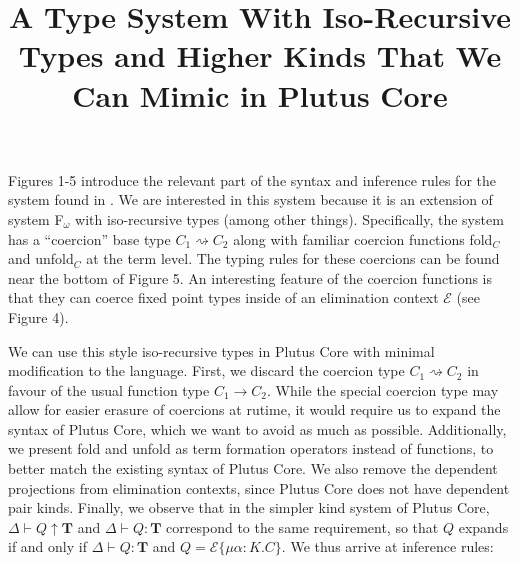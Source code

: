 \documentclass{article}
\title{A Type System With Iso-Recursive Types and Higher Kinds That We Can Mimic in Plutus Core}
\renewcommand{\:}{\mathbin{:}}
\begin{document}
\maketitle

Figures 1-5 introduce the relevant part of the syntax and inference rules for the system found in \cite{Dreyer05}. We are interested in this system because it is an extension of system F$_\omega$ with iso-recursive types (among other things). Specifically, the system has a ``coercion'' base type $C_1 \rightsquigarrow C_2$ along with familiar coercion functions {\sf fold}$_C$ and {\sf unfold}$_C$ at the term level. The typing rules for these coercions can be found near the bottom of Figure 5. An interesting feature of the coercion functions is that they can coerce fixed point types inside of an elimination context $\mathcal{E}$ (see Figure 4).

We can use this style iso-recursive types in Plutus Core with minimal modification to the language. First, we discard the coercion type $C_1 \rightsquigarrow C_2$ in favour of the usual function type $C_1 \longrightarrow C_2$. While the special coercion type may allow for easier erasure of coercions at rutime, it would require us to expand the syntax of Plutus Core, which we want to avoid as much as possible. Additionally, we present {\sf fold} and {\sf unfold} as term formation operators instead of functions, to better match the existing syntax of Plutus Core. We also remove the dependent projections from elimination contexts, since Plutus Core does not have dependent pair kinds. Finally, we observe that in the simpler kind system of Plutus Core, $\Delta \vdash Q \uparrow \textbf{T}$ and $\Delta \vdash Q \: \textbf{T}$ correspond to the same requirement, so that $Q$ expands if and only if $\Delta \vdash Q \: \textbf{T}$ and $Q = \mathcal{E}\{\mu\alpha\: K.C\}$. We thus arrive at inference rules:

\end{document}

